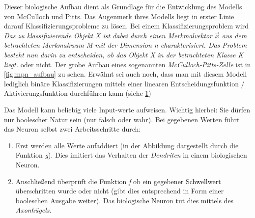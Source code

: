 Dieser biologische Aufbau dient als Grundlage für die Entwicklung des Modells von McCulloch und Pitts. Das Augenmerk ihres Modells liegt in erster Linie darauf Klassifizierungsprobleme zu lösen. Bei einem Klassifizierungsproblem wird \emph{Das zu klassifizierende Objekt X ist dabei durch einen Merkmalvektor $\vec{x}$ aus dem betrachteten Merkmalraum M mit der Dimension n charakterisiert. Das Problem besteht nun darin zu entscheiden, ob das Objekt X in der betrachteten Klasse K liegt.} \cite{klproblem} oder nicht. Der grobe Aufbau eines sogenannten \emph{McCulloch-Pitts-Zelle} ist in \ref{fig:mpn_aufbau} zu sehen. Erwähnt sei auch noch, dass man mit diesem Modell lediglich binäre Klassifizierungen mittels einer linearen Entscheidungsfunktion / Aktivierungsfunktion durchführen kann (siehe \ref{fig:aufbau})


\begin{figure}%
  \centering
  \qquad
  \label{fig:aufbau}
\end{figure}

Das Modell kann beliebig viele Input-werte aufweisen. Wichtig hierbei: Sie dürfen nur boolescher Natur sein (nur falsch oder wahr). Bei gegebenen Werten führt das Neuron selbst zwei Arbeitsschritte durch: 
\begin{enumerate}

\item Erst werden alle Werte aufaddiert (in der Abbildung dargestellt durch die Funktion \emph{g}). Dies imitiert das Verhalten der \emph{Dendriten} in einem biologischen Neuron. 

\item Anschließend überprüft die Funktion \emph{f} ob ein gegebener Schwellwert überschritten wurde oder nicht (gibt dies entsprechend in Form einer booleschen Ausgabe weiter). Das biologische Neuron tut dies mittels des \emph{Axonhügels}. 

\end{enumerate}

